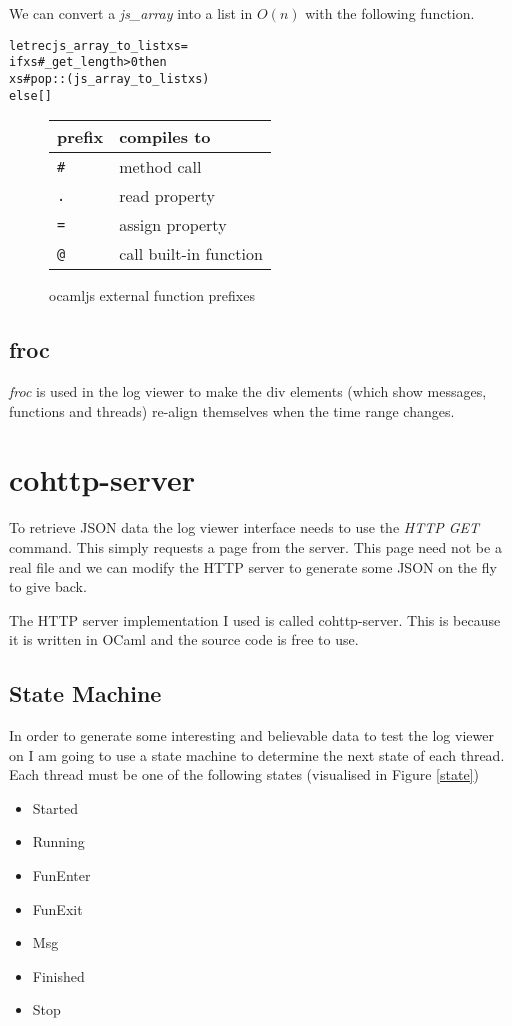 We can convert a \emph{js\_array} into a list in \texttt{$O(n)$} with the following function.

\begin{alltt}
let rec js\_array\_to\_list xs =
  if xs\#\_get\_length > 0 then
    xs\#pop :: (js\_array\_to\_list xs)
  else []
\end{alltt}

\begin{figure}
  \centering
  \begin{tabular}{|l|l|}
    \hline
    \textbf{prefix} & \textbf{compiles to}\\ \hline
    \texttt{\#} & method call\\ \hline
    \texttt{.} & read property\\ \hline
    \texttt{=} & assign property\\ \hline
    \texttt{@} & call built-in function\\ \hline
  \end{tabular}
  \caption{ocamljs external function prefixes}
  \label{external}
\end{figure}

\subsection{froc}
\emph{froc} is used in the log viewer to make the div elements (which show messages, functions and threads) re-align themselves when the time range changes.

\section{cohttp-server}
To retrieve JSON data the log viewer interface needs to use the \emph{HTTP GET} command. This simply requests a page from the server. This page need not be a real file and we can modify the HTTP server to generate some JSON on the fly to give back.

The HTTP server implementation I used is called cohttp-server. This is because it is written in OCaml and the source code is free to use.

\subsection{State Machine}
In order to generate some interesting and believable data to test the log viewer on I am going to use a state machine to determine the next state of each thread. Each thread must be one of the following states (visualised in Figure \ref{state})
\begin{itemize}{}
\item Started
\item Running
\item FunEnter
\item FunExit
\item Msg
\item Finished
\item Stop
\end{itemize}

